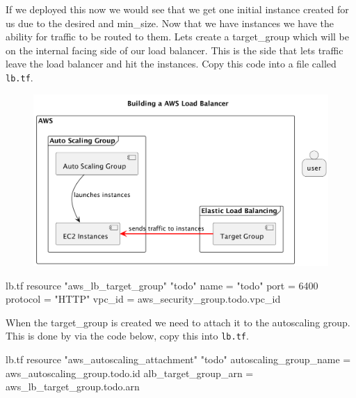 \documentclass{csse4400}
\begin{document}

If we deployed this now we would see that we get one initial instance created for us due to the desired and min\_size. Now that we have instances we have the ability for traffic to be routed to them. Lets create a target\_group which will be on the internal facing side of our load balancer. This is the side that lets traffic leave the load balancer and hit the instances. Copy this code into a file called \texttt{lb.tf}.

\begin{figure}[H]
  \begin{center}
    \includegraphics[scale=0.2]{diagrams/lb2}
  \end{center}
\end{figure}

\begin{code}[language=terraform,numbers=none,keepspaces=true]{lb.tf}
resource "aws_lb_target_group" "todo" {
  name     = "todo"
  port     = 6400
  protocol = "HTTP"
  vpc_id   = aws_security_group.todo.vpc_id
}
\end{code}

When the target\_group is created we need to attach it to the autoscaling group. This is done by via the code below, copy this into \texttt{lb.tf}.

\begin{code}[language=terraform,numbers=none,keepspaces=true]{lb.tf}
resource "aws_autoscaling_attachment" "todo" {
  autoscaling_group_name = aws_autoscaling_group.todo.id
  alb_target_group_arn   = aws_lb_target_group.todo.arn
}
\end{code}
\end{document}

